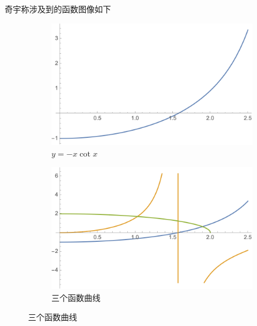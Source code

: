         奇宇称涉及到的函数图像如下
        \begin{figure}[H]
            \centering
            \begin{subfigure}{0.48\textwidth}
                    
                \centering
                \includegraphics[scale=0.4]{-xcotx.png}
                \caption{$y=-x \cot{x}$}
                
            \end{subfigure}
            \begin{subfigure}{0.48\textwidth}
                
                \centering
                \includegraphics[scale=0.4]{3plot.png}
                \caption{三个函数曲线}

            \end{subfigure}
              
        \end{figure}

